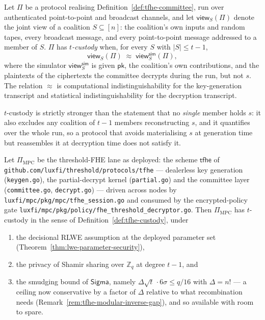 \begin{definition}[Custody]
\label{def:tfhe-custody}
Let $\Pi$ be a protocol realising Definition~\ref{def:tfhe-committee}, run
over authenticated point-to-point and broadcast channels, and let
$\mathsf{view}_S(\Pi)$ denote the joint view of a coalition $S \subseteq [n]$:
the coalition's own inputs and random tapes, every broadcast message, and
every point-to-point message addressed to a member of $S$. $\Pi$ has
\emph{$t$-custody} when, for every $S$ with $|S| \le t - 1$,
\[
  \mathsf{view}_S(\Pi) \;\approx\; \mathsf{view}_S^{\mathsf{sim}}(\Pi),
\]
where the simulator $\mathsf{view}^{\mathsf{sim}}_S$ is given
$\mathsf{pk}$, the coalition's own contributions, and the plaintexts of the
ciphertexts the committee decrypts during the run, but not $s$. The relation
$\approx$ is computational indistinguishability for the key-generation
transcript and statistical indistinguishability for the decryption transcript.

$t$-custody is strictly stronger than the statement that no \emph{single}
member holds $s$: it also excludes any coalition of $t-1$ members
reconstructing $s$, and it quantifies over the whole run, so a protocol that
avoids materialising $s$ at generation time but reassembles it at decryption
time does not satisfy it.
\end{definition}

\begin{theorem}
\label{thm:tfhe-mchain-custody}
Let $\Pi_{\mathrm{MPC}}$ be the threshold-FHE lane as deployed: the scheme
$\mathsf{tfhe}$ of \texttt{github.com/luxfi/threshold/protocols/tfhe} ---
dealerless key generation (\texttt{keygen.go}), the partial-decrypt
kernel (\texttt{partial.go}) and the committee layer
(\texttt{committee.go}, \texttt{decrypt.go}) --- driven across nodes by
\texttt{luxfi/mpc/pkg/mpc/tfhe\_session.go} and consumed by the encrypted-policy
gate \texttt{luxfi/mpc/pkg/policy/fhe\_threshold\_decryptor.go}. Then
$\Pi_{\mathrm{MPC}}$ has $t$-custody in the sense of
Definition~\ref{def:tfhe-custody}, under
\begin{enumerate}[nosep]
  \item the decisional RLWE assumption at the deployed parameter set
        (Theorem~\ref{thm:lwe-parameter-security}),
  \item the privacy of Shamir sharing over $\mathbb{Z}_q$ at degree $t-1$, and
  \item the smudging bound of $\mathsf{Sigma}$, namely
        $\Delta \sqrt{t}\,\cdot 6\sigma \le q/16$ with $\Delta = n!$ --- a
        ceiling now conservative by a factor of $\Delta$ relative to what
        recombination needs (Remark~\ref{rem:tfhe-modular-inverse-gap}), and so
        available with room to spare.
\end{enumerate}
\end{theorem}

